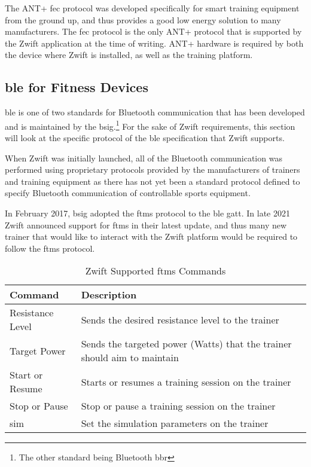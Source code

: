 The ANT+ \ac{fec} protocol was developed specifically for smart training equipment from the ground up, and thus provides a good low energy solution to many manufacturers. The \ac{fec} protocol is the only ANT+ protocol that is supported by the Zwift application at the time of writing. ANT+ hardware is required by both the device where Zwift is installed, as well as the training platform.

\subsection{\acf{ble} for Fitness Devices}
\ac{ble} is one of two standards for Bluetooth communication that has been developed and is maintained by the \ac{bsig}.\footnote{The other standard being Bluetooth \ac{bbr}} For the sake of Zwift requirements, this section will look at the specific protocol of the \ac{ble} specification that Zwift supports.

When Zwift was initially launched, all of the Bluetooth communication was performed using proprietary protocols provided by the manufacturers of trainers and training equipment as there has not yet been a standard protocol defined to specify Bluetooth communication of controllable sports equipment.

In February 2017, \ac{bsig} adopted the \ac{ftms} protocol to the \ac{ble} \ac{gatt}. In late 2021 Zwift announced support for \ac{ftms} in their latest update, and thus many new trainer that would like to interact with the Zwift platform would be required to follow the \ac{ftms} protocol. \citep[2021]{Jeremy:2021}

\begin{table}[H]
	\renewcommand{\arraystretch}{\tablestretch}
	\centering
	\caption{Zwift Supported \ac{ftms} Commands}
	\begin{tabularx}{\textwidth}{ >{\raggedright}p{4cm} X}
		\toprule
		Command          & Description                                                              \\
		\midrule
		Resistance Level & Sends the desired resistance level to the trainer                        \\
		Target Power     & Sends the targeted power (Watts) that the trainer should aim to maintain \\
		Start or Resume  & Starts or resumes a training session on the trainer                      \\
		Stop or Pause    & Stop or pause a training session on the trainer                          \\
		\ac{sim}         & Set the simulation parameters on the trainer                             \\
		\bottomrule
	\end{tabularx}
	\label{tab:blreq}
\end{table}

